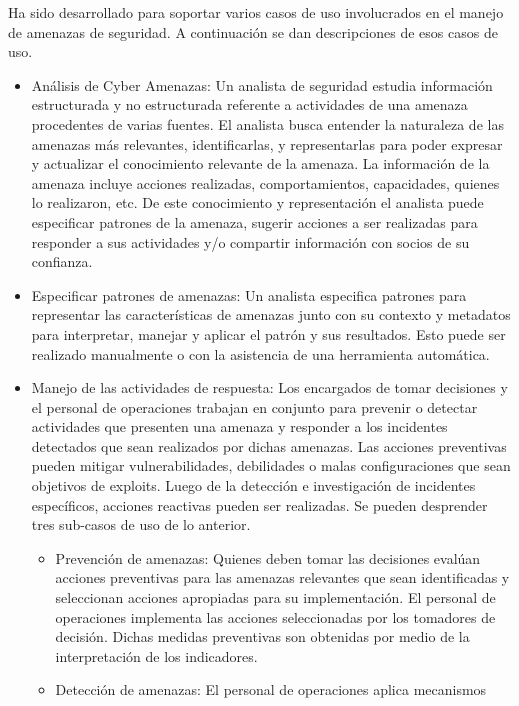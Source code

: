 Ha sido desarrollado para soportar varios casos de uso involucrados en el 
manejo de amenazas de seguridad. A continuación se dan descripciones de esos 
casos de uso.
\begin{itemize}
  \item Análisis de Cyber Amenazas: Un analista de seguridad estudia información 
  estructurada y no estructurada referente a actividades de una amenaza 
  procedentes de varias fuentes. El analista busca entender la naturaleza de las 
  amenazas más relevantes, identificarlas, y representarlas para poder expresar 
  y actualizar el conocimiento relevante de la amenaza. La información de la 
  amenaza incluye acciones realizadas, comportamientos, capacidades, quienes lo 
  realizaron, etc. De este conocimiento y representación el analista puede 
  especificar patrones de la amenaza, sugerir acciones a ser realizadas para 
  responder a sus actividades y/o compartir información con socios de su 
  confianza.
  \item Especificar patrones de amenazas: Un analista especifica patrones para 
  representar las características de amenazas junto con su contexto y metadatos 
  para interpretar, manejar y aplicar el patrón y sus resultados. Esto puede ser 
  realizado manualmente o con la asistencia de una herramienta automática.
  \item Manejo de las actividades de respuesta: Los encargados de tomar decisiones y el personal de operaciones trabajan 
  en conjunto para prevenir o detectar actividades que presenten una amenaza y 
  responder a los incidentes detectados que sean realizados por dichas amenazas. 
  Las acciones preventivas pueden mitigar vulnerabilidades, debilidades o malas 
  configuraciones que sean objetivos de exploits. Luego de la detección e 
  investigación de incidentes específicos, acciones reactivas pueden ser 
  realizadas. Se pueden desprender tres sub-casos de uso de lo anterior.
  \begin{itemize}
    \item Prevención de amenazas: Quienes deben tomar las decisiones evalúan 
    acciones preventivas para las amenazas relevantes que sean identificadas y 
    seleccionan acciones apropiadas para su implementación. El personal de 
    operaciones implementa las acciones seleccionadas por los tomadores de 
    decisión. Dichas medidas preventivas son obtenidas por medio de la 
    interpretación de los indicadores.
    \item Detección de amenazas: El personal de operaciones aplica mecanismos 

\end{itemize}
\end{itemize}
